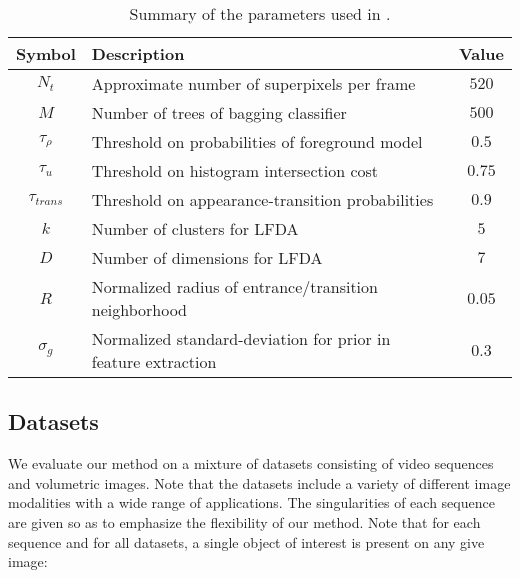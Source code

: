 \begin{table}[htbp]
\centering
\begin{tabular}{c p{8cm} c }
\toprule
Symbol & Description & Value \\
\toprule
$N_t$   & Approximate number of superpixels per frame & $520$\\
$M$   & Number of trees of bagging classifier& $500$ \\
$\tau_{\rho}$   & Threshold on probabilities of foreground model & $0.5$\\ 
$\tau_{u}$   & Threshold on histogram intersection cost & $0.75$ \\ 
$\tau_{trans}$  & Threshold on appearance-transition probabilities & $0.9$\\
$k$ & Number of clusters for LFDA & $5$\\ 
$D$ & Number of dimensions for LFDA & $7$\\ 
$R$   &Normalized radius of entrance/transition neighborhood & $0.05$ \\ 
$\sigma_{g}$  & Normalized standard-deviation for prior in feature extraction & $0.3$ \\
\bottomrule
\end{tabular}
\caption{Summary of the parameters used in \KSP.}
\label{tab:parameters}
\end{table}

\subsection{Datasets}
\label{sec:data}
We evaluate our method on a mixture of datasets consisting of video sequences and volumetric images. Note that the datasets include a variety of different image modalities with a wide range of applications. The singularities of each sequence are given so as to emphasize the flexibility of our method. Note that for each sequence and for all datasets, a single object of interest is present on any give image:

